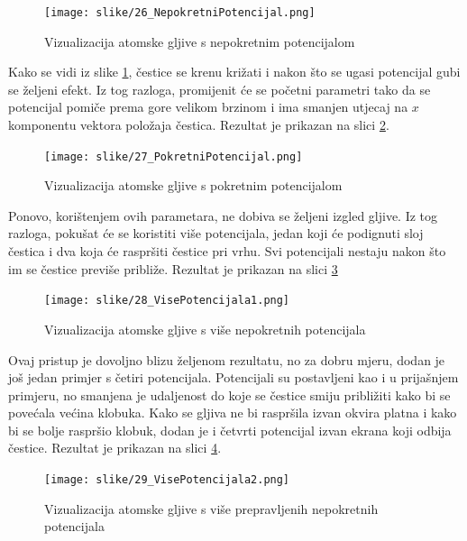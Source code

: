 \documentclass{foi}
\begin{document}
\begin{figure}[H]
    \centering
    \texttt{[image: slike/26\_NepokretniPotencijal.png]}
    \captionsetup{justification=centering}
    \caption{Vizualizacija atomske gljive s nepokretnim potencijalom}
\label{fig:NepokretniPotencijal}
\end{figure}

Kako se vidi iz slike \ref{fig:NepokretniPotencijal}, čestice se krenu križati i nakon što se ugasi potencijal gubi se željeni efekt. Iz tog razloga, promijenit će se početni parametri tako da se potencijal pomiče prema gore velikom brzinom i ima smanjen utjecaj na $x$ komponentu vektora položaja čestica. Rezultat je prikazan na slici \ref{fig:PokretniPotencijal}.

\begin{figure}[H]
    \centering
    \texttt{[image: slike/27\_PokretniPotencijal.png]}
    \captionsetup{justification=centering}
    \caption{Vizualizacija atomske gljive s pokretnim potencijalom}
\label{fig:PokretniPotencijal}
\end{figure}

Ponovo, korištenjem ovih parametara, ne dobiva se željeni izgled gljive. Iz tog razloga, pokušat će se koristiti više potencijala, jedan koji će podignuti sloj čestica i dva koja će raspršiti čestice pri vrhu.  Svi potencijali nestaju nakon što im se čestice previše približe. Rezultat je prikazan na slici \ref{fig:VisePotencijala1}

\begin{figure}[H]
    \centering
    \texttt{[image: slike/28\_VisePotencijala1.png]}
    \captionsetup{justification=centering}
    \caption{Vizualizacija atomske gljive s više nepokretnih potencijala}
\label{fig:VisePotencijala1}
\end{figure}

Ovaj pristup je dovoljno blizu željenom rezultatu, no za dobru mjeru, dodan je još jedan primjer s četiri potencijala. Potencijali su postavljeni kao i u prijašnjem primjeru, no smanjena je udaljenost do koje se čestice smiju približiti kako bi se povećala većina klobuka. Kako se gljiva ne bi raspršila izvan okvira platna i kako bi se bolje raspršio klobuk, dodan je i četvrti potencijal izvan ekrana koji odbija čestice. Rezultat je prikazan na slici \ref{fig:VisePotencijala2}.


\begin{figure}[H]
    \centering
    \texttt{[image: slike/29\_VisePotencijala2.png]}
    \captionsetup{justification=centering}
    \caption{Vizualizacija atomske gljive s više prepravljenih nepokretnih potencijala}
\label{fig:VisePotencijala2}
\end{figure}
\end{document}

